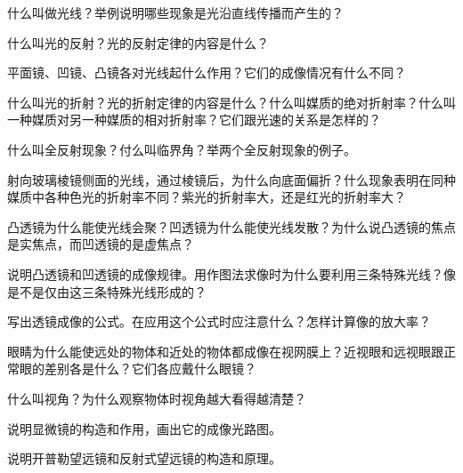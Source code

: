 \begin{Review}
\begin{question}
  \item 什么叫做光线？举例说明哪些现象是光沿直线传播而产生的？
  \item 什么叫光的反射？光的反射定律的内容是什么？
  \item 平面镜、凹镜、凸镜各对光线起什么作用？它们的成像情况有什么不同？
  \item 什么叫光的折射？光的折射定律的内容是什么？什么叫媒质的绝对折射率？什么叫一种媒质对另一种媒质的相对折射率？它们跟光速的关系是怎样的？
  \item 什么叫全反射现象？付么叫临界角？举两个全反射现象的例子。
  \item 射向玻璃棱镜侧面的光线，通过棱镜后，为什么向底面偏折？什么现象表明在同种媒质中各种色光的折射率不同？紫光的折射率大，还是红光的折射率大？
  \item 凸透镜为什么能使光线会聚？凹透镜为什么能使光线发散？为什么说凸透镜的焦点是实焦点，而凹透镜的是虚焦点？
  \item 说明凸透镜和凹透镜的成像规律。用作图法求像时为什么要利用三条特殊光线？像是不是仅由这三条特殊光线形成的？

  写出透镜成像的公式。在应用这个公式时应注意什么？怎样计算像的放大率？
  \item 眼睛为什么能使远处的物体和近处的物体都成像在视网膜上？近视眼和远视眼跟正常眼的差别各是什么？它们各应戴什么眼镜？
  \item 什么叫视角？为什么观察物体时视角越大看得越清楚？
  \item 说明显微镜的构造和作用，画出它的成像光路图。
  \item 说明开普勒望远镜和反射式望远镜的构造和原理。
\end{question}
\end{Review}

